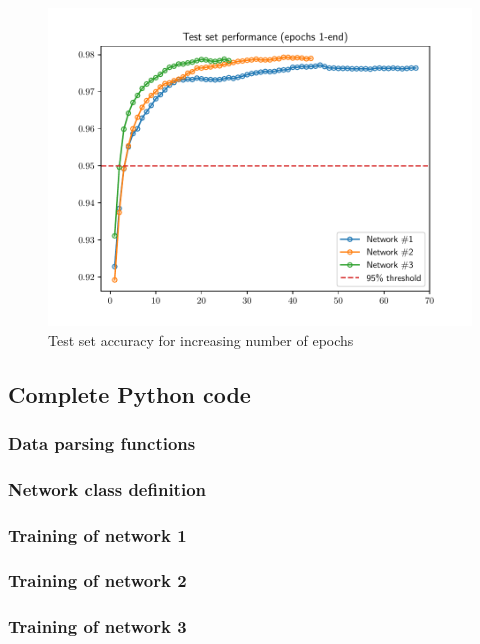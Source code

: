 \documentclass[letterpaper,headings=standardclasses]{scrartcl}
\begin{document}
\begin{figure}[H]
    \centering
    \includegraphics[width=.7\linewidth]{tests.pdf}
    \caption{Test set accuracy for increasing number of epochs}
    \label{tests_plot}
\end{figure}

\subsection{Complete Python code}

\subsubsection{Data parsing functions}



\subsubsection{Network class definition}



\subsubsection{Training of network 1}



\subsubsection{Training of network 2}



\subsubsection{Training of network 3}


\end{document}
